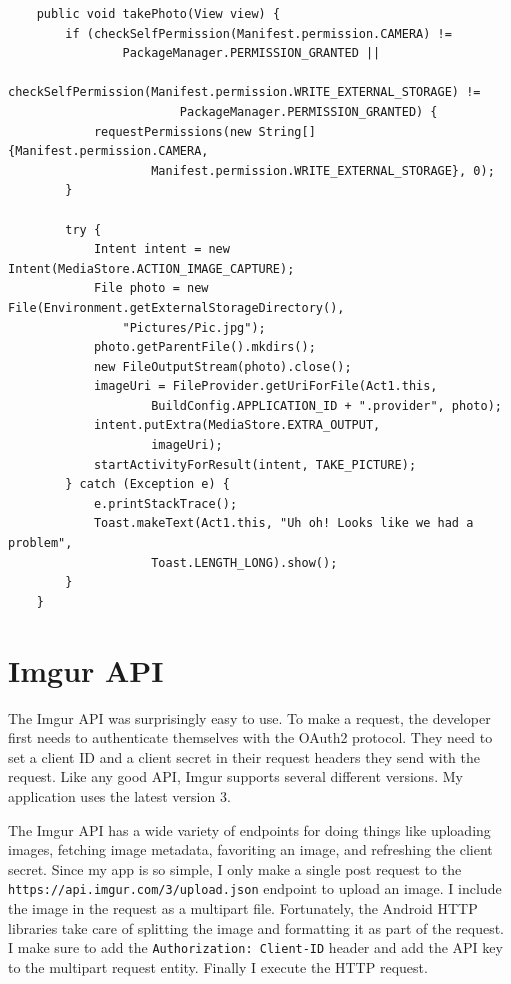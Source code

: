 \documentclass[12pt]{article}
\begin{document}
\begin{verbatim}
    public void takePhoto(View view) {
        if (checkSelfPermission(Manifest.permission.CAMERA) !=
                PackageManager.PERMISSION_GRANTED ||
                checkSelfPermission(Manifest.permission.WRITE_EXTERNAL_STORAGE) !=
                        PackageManager.PERMISSION_GRANTED) {
            requestPermissions(new String[]{Manifest.permission.CAMERA,
                    Manifest.permission.WRITE_EXTERNAL_STORAGE}, 0);
        }

        try {
            Intent intent = new Intent(MediaStore.ACTION_IMAGE_CAPTURE);
            File photo = new File(Environment.getExternalStorageDirectory(),
                "Pictures/Pic.jpg");
            photo.getParentFile().mkdirs();
            new FileOutputStream(photo).close();
            imageUri = FileProvider.getUriForFile(Act1.this,
                    BuildConfig.APPLICATION_ID + ".provider", photo);
            intent.putExtra(MediaStore.EXTRA_OUTPUT,
                    imageUri);
            startActivityForResult(intent, TAKE_PICTURE);
        } catch (Exception e) {
            e.printStackTrace();
            Toast.makeText(Act1.this, "Uh oh! Looks like we had a problem",
                    Toast.LENGTH_LONG).show();
        }
    }
\end{verbatim}



\section{Imgur API}
The Imgur API was surprisingly easy to use. To make a request, the developer first needs to authenticate themselves with the OAuth2 protocol. They need to set a client ID and a client secret in their request headers they send with the request. Like any good API, Imgur supports several different versions. My application uses the latest version 3.


The Imgur API has a wide variety of endpoints for doing things like uploading images, fetching image metadata, favoriting an image, and refreshing the client secret. Since my app is so simple, I only make a single post request to the \texttt{https://api.imgur.com/3/upload.json} endpoint to upload an image. I include the image in the request as a multipart file. Fortunately, the Android HTTP libraries take care of splitting the image and formatting it as part of the request. I make sure to add the \texttt{Authorization: Client-ID} header and add the API key to the multipart request entity. Finally I execute the HTTP request.
\end{document}
